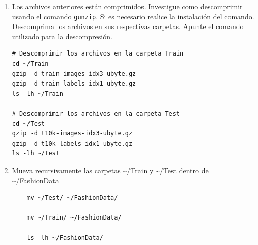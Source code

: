 \documentclass{article}
\begin{document}
\begin{enumerate}
\begin{verbatim}
\end{verbatim}

\begin{verbatim}
   total 89M
   drwxr-xr-x 2 eareal LeonardoRodriguez 4.0K Jun 19 12:52 Test
   drwxr-xr-x 2 eareal LeonardoRodriguez 4.0K Jun 19 12:52 Train
   -rw-r--r-- 1 eareal LeonardoRodriguez 4.3M Aug 31  2017 t10k-images-idx3-ubyte.gz
   -rw-r--r-- 1 eareal LeonardoRodriguez 4.3M Aug 31  2017 t10k-images-idx3-ubyte.gz.1
   -rw-r--r-- 1 eareal LeonardoRodriguez 4.3M Aug 31  2017 t10k-images-idx3-ubyte.gz.2
   -rw-r--r-- 1 eareal LeonardoRodriguez 5.1K Aug 31  2017 t10k-labels-idx1-ubyte.gz
   -rw-r--r-- 1 eareal LeonardoRodriguez 5.1K Aug 31  2017 t10k-labels-idx1-ubyte.gz.1
   -rw-r--r-- 1 eareal LeonardoRodriguez 5.1K Aug 31  2017 t10k-labels-idx1-ubyte.gz.2
   -rw-r--r-- 1 eareal LeonardoRodriguez  26M Aug 31  2017 train-images-idx3-ubyte.gz
   -rw-r--r-- 1 eareal LeonardoRodriguez  26M Aug 31  2017 train-images-idx3-ubyte.gz.1
   -rw-r--r-- 1 eareal LeonardoRodriguez  26M Aug 31  2017 train-images-idx3-ubyte.gz.2
   -rw-r--r-- 1 eareal LeonardoRodriguez  29K Aug 31  2017 train-labels-idx1-ubyte.gz
   -rw-r--r-- 1 eareal LeonardoRodriguez  29K Aug 31  2017 train-labels-idx1-ubyte.gz.1
   -rw-r--r-- 1 eareal LeonardoRodriguez  29K Aug 31  2017 train-labels-idx1-ubyte.gz.2
\end{verbatim}

\item Los archivos anteriores están comprimidos. Investigue como
descomprimir usando el comando \texttt{gunzip}. Si es necesario realice la
instalación del comando. Descomprima los archivos en sus
respectivas carpetas. Apunte el comando utilizado para la descompresión.
\begin{verbatim}
# Descomprimir los archivos en la carpeta Train
cd ~/Train
gzip -d train-images-idx3-ubyte.gz
gzip -d train-labels-idx1-ubyte.gz
ls -lh ~/Train

# Descomprimir los archivos en la carpeta Test
cd ~/Test
gzip -d t10k-images-idx3-ubyte.gz
gzip -d t10k-labels-idx1-ubyte.gz
ls -lh ~/Test
\end{verbatim}

\item Mueva recursivamente las carpetas \textasciitilde{}/Train y \textasciitilde{}/Test dentro de \textasciitilde{}/FashionData
\begin{verbatim}
    mv ~/Test/ ~/FashionData/

    mv ~/Train/ ~/FashionData/

    ls -lh ~/FashionData/
    

\end{verbatim}
\end{enumerate}
\end{document}
